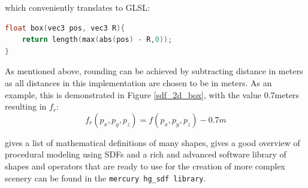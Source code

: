 \documentclass[twoside,a4paper]{article}
\begin{document}
which conveniently translates to GLSL:

\begin{lstlisting}[language=C, caption={\it GLSL code for creating a box SDF},captionpos=b, label=lst:boxSdf]
float box(vec3 pos, vec3 R){
    return length(max(abs(pos) - R,0));
}
\end{lstlisting}
As mentioned above, rounding can be achieved by subtracting distance in meters as all distances in this implementation are chosen to be in meters. As an example, this is demonstrated in Figure \ref{sdf_2d_box}, with the value 0.7meters resulting in $f_r$:
\begin{equation}
f_r(p_x, p_y, p_z) = f(p_x, p_y, p_z)-0.7m
\end{equation}

\cite{hart_sphere_1996} gives a list of mathematical definitions of many shapes, \cite{diener_procedural_2012} gives a good overview of procedural modeling using SDFs and a rich and advanced  software library of shapes and operators that are ready to use for the creation of more complex scenery can be found in the \texttt{mercury hg\_sdf library}\cite{mercury}.
\end{document}
